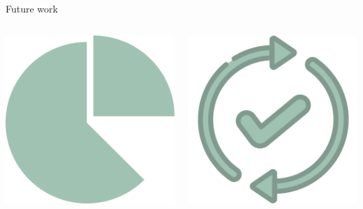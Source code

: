 \documentclass[9pt, pstricks, xcolor=dvipsnames]{beamer}
\begin{document}
\begin{frame}{Future work}

	\begin{columns}
		\begin{column}{0.5\textwidth}
			\centering
			\includegraphics[scale=0.2]{images/portion.png}
			\pause
		\end{column}
		\begin{column}{0.5\textwidth}
			\centering
			\includegraphics[scale=0.2]{images/update.png}
		\end{column}
	\end{columns}
\end{frame}
\AtEndDocument\maketitle
\end{document}
